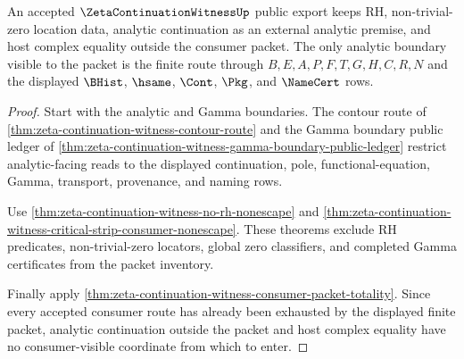 \begin{theorem}
\label{thm:zeta-continuation-witness-analytic-boundary-nonescape}
An accepted $\ZetaContinuationWitnessUp$ public export keeps RH, non-trivial-zero location data, analytic continuation as an external analytic premise, and host complex equality outside the consumer packet. The only analytic boundary visible to the packet is the finite route through $B,E,A,P,F,T,G,H,C,R,N$ and the displayed $\BHist$, $\hsame$, $\Cont$, $\Pkg$, and $\NameCert$ rows.
\end{theorem}
\begin{proof}
Start with the analytic and Gamma boundaries. The contour route of \autoref{thm:zeta-continuation-witness-contour-route} and the Gamma boundary public ledger of \autoref{thm:zeta-continuation-witness-gamma-boundary-public-ledger} restrict analytic-facing reads to the displayed continuation, pole, functional-equation, Gamma, transport, provenance, and naming rows.

Use \autoref{thm:zeta-continuation-witness-no-rh-nonescape} and \autoref{thm:zeta-continuation-witness-critical-strip-consumer-nonescape}. These theorems exclude RH predicates, non-trivial-zero locators, global zero classifiers, and completed Gamma certificates from the packet inventory.

Finally apply \autoref{thm:zeta-continuation-witness-consumer-packet-totality}. Since every accepted consumer route has already been exhausted by the displayed finite packet, analytic continuation outside the packet and host complex equality have no consumer-visible coordinate from which to enter.
\end{proof}
